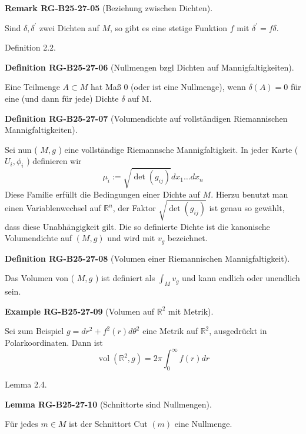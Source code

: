 \documentclass[10pt, letterpaper]{article}
\newcommand{\R}{\mathbb{R}}
\newcommand{\CustomHeading}[3]{%
  \par\medskip\noindent%
  \textbf{#1 #2} \textnormal{(#3)}.\enskip%
}
\newenvironment{DEF}[2]{\begin{unitbox}\CustomHeading{Definition}{#1}{#2}}{\end{unitbox}}
\newenvironment{LEM}[2]{\begin{unitbox}\CustomHeading{Lemma}{#1}{#2}}{\end{unitbox}}
\newenvironment{REM}[2]{\begin{unitbox}\CustomHeading{Remark}{#1}{#2}}{\end{unitbox}}
\newenvironment{EXA}[2]{\begin{unitbox}\CustomHeading{Example}{#1}{#2}}{\end{unitbox}}
\begin{document}
\begin{REM}{RG-B25-27-05}{Beziehung zwischen Dichten}
Sind $\delta, \delta^{\prime}$ zwei Dichten auf $M$, so gibt es eine stetige Funktion $f$ mit $\delta^{\prime}=f \delta$.
\end{REM}




Definition 2.2. 


\begin{DEF}{RG-B25-27-06}{Nullmengen bzgl Dichten auf Mannigfaltigkeiten}
Eine Teilmenge $A \subset M$ hat Maß 0 (oder ist eine Nullmenge), wenn $\delta(A)=0$ für eine (und dann für jede) Dichte $\delta$ auf M.
\end{DEF}



\begin{DEF}{RG-B25-27-07}{Volumendichte auf vollständigen Riemannischen Mannigfaltigkeiten}
Sei nun ( $M, g$ ) eine vollständige Riemannsche Mannigfaltigkeit. In jeder Karte ( $U_{i}, \phi_{i}$ ) definieren wir
$$
\mu_{i}:=\sqrt{\operatorname{det}\left(g_{i j}\right)} d x_{1} \ldots d x_{n}
$$
Diese Familie erfüllt die Bedingungen einer Dichte auf $M$. Hierzu benutzt man einen Variablenwechsel auf $\mathbb{R}^{n}$, der Faktor $\sqrt{\operatorname{det}\left(g_{i j}\right)}$ ist genau so gewählt, dass diese Unabhängigkeit gilt. Die so definierte Dichte ist die kanonische Volumendichte auf $(M, g)$ und wird mit $v_{g}$ bezeichnet.
\end{DEF}



\begin{DEF}{RG-B25-27-08}{Volumen einer Riemannischen Mannigfaltigkeit}
Das Volumen von ( $M, g$ ) ist definiert als $\int_{M} v_{g}$ und kann endlich oder unendlich sein.
\end{DEF}




\begin{EXA}{RG-B25-27-09}{Volumen auf $\R^2$ mit Metrik}
Sei zum Beispiel $g=d r^{2}+f^{2}(r) d \theta^{2}$ eine Metrik auf $\mathbb{R}^{2}$, ausgedrückt in Polarkoordinaten. Dann ist
$$
\operatorname{vol}\left(\mathbb{R}^{2}, g\right)=2 \pi \int_{0}^{\infty} f(r) d r
$$
\end{EXA}





Lemma 2.4. 

\begin{LEM}{RG-B25-27-10}{Schnittorte sind Nullmengen}
Für jedes $m \in M$ ist der Schnittort Cut $(m)$ eine Nullmenge.
\end{LEM}
\end{document}
